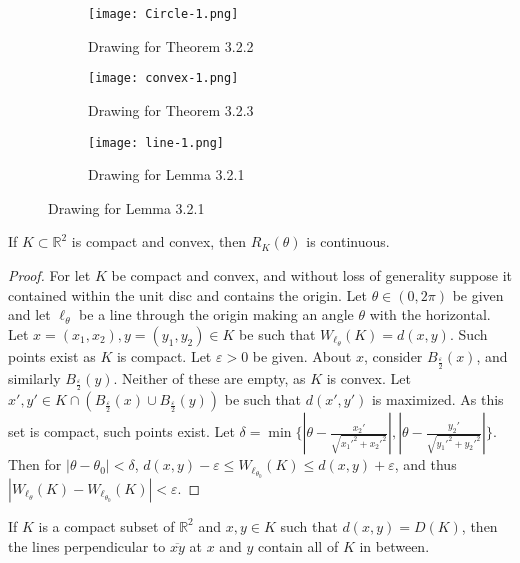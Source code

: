 \documentclass[crop=false,class=article,oneside]{standalone}
\begin{document}
        \begin{figure}[H]
          \begin{subfigure}[b]{0.32\textwidth}
             \centering
            \texttt{[image: Circle-1.png]}
            \caption{Drawing for Theorem 3.2.2}
          \end{subfigure}
          \begin{subfigure}[b]{0.32\textwidth}
            \centering
            \texttt{[image: convex-1.png]}
            \caption{Drawing for Theorem 3.2.3}
          \end{subfigure}
          \begin{subfigure}[b]{0.32\textwidth}
            \centering
            \texttt{[image: line-1.png]}
            \caption{Drawing for Lemma 3.2.1}
          \end{subfigure}  
        \end{figure}
        \begin{theorem}
        If $K\subset \mathbb{R}^2$ is compact and convex, then $R_K(\theta)$ is continuous.
        \end{theorem}
        \begin{proof}
        For let $K$ be compact and convex, and without loss of generality suppose it contained within the unit disc and contains the origin. Let $\theta\in (0,2\pi)$ be given and let $\ell_{\theta}$ be a line through the origin making an angle $\theta$ with the horizontal. Let $x=(x_1,x_2),y=(y_1,y_2)\in K$ be such that $W_{\ell_{\theta}}(K) = d(x,y)$. Such points exist as $K$ is compact. Let $\varepsilon>0$ be given. About $x$, consider $B_{\frac{\varepsilon}{2}}(x)$, and similarly $B_{\frac{\varepsilon}{2}}(y)$. Neither of these are empty, as $K$ is convex. Let $x',y'\in K\cap(B_{\frac{\varepsilon}{2}}(x)\cup B_{\frac{\varepsilon}{2}}(y))$ be such that $d(x',y')$ is maximized. As this set is compact, such points exist. Let $\delta = \min\{|\theta-\frac{x_2'}{\sqrt{x_1'^2+x_2'^2}}|,|\theta-\frac{y_2'}{\sqrt{y_1'^2+y_2'^2}}|\}$. Then for $|\theta-\theta_0|<\delta$, $d(x,y)-\varepsilon \leq W_{\ell_{\theta_0}}(K)\leq d(x,y)+\varepsilon$, and thus $|W_{\ell_\theta}(K)-W_{\ell_{\theta_0}}(K)| < \varepsilon$.
        \end{proof}
        \begin{lemma}
        If $K$ is a compact subset of $\mathbb{R}^2$ and $x,y\in K$ such that $d(x,y)=D(K)$, then the lines perpendicular to $\overline{xy}$ at $x$ and $y$ contain all of $K$ in between.
        \end{lemma}
\end{document}
